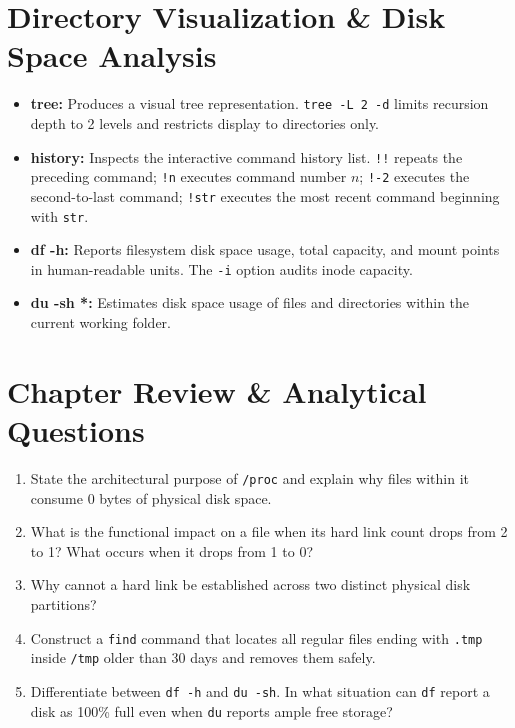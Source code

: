 \section{Directory Visualization \& Disk Space Analysis}
\begin{itemize}[leftmargin=1.5em]
    \item \textbf{tree:} Produces a visual tree representation. \texttt{tree -L 2 -d} limits recursion depth to 2 levels and restricts display to directories only.
    \item \textbf{history:} Inspects the interactive command history list. \texttt{!!} repeats the preceding command; \texttt{!n} executes command number $n$; \texttt{!-2} executes the second-to-last command; \texttt{!str} executes the most recent command beginning with \texttt{str}.
    \item \textbf{df -h:} Reports filesystem disk space usage, total capacity, and mount points in human-readable units. The \texttt{-i} option audits inode capacity.
    \item \textbf{du -sh *:} Estimates disk space usage of files and directories within the current working folder.
\end{itemize}

\section{Chapter Review \& Analytical Questions}
\begin{enumerate}[leftmargin=1.5em]
    \item State the architectural purpose of \texttt{/proc} and explain why files within it consume 0 bytes of physical disk space.
    \item What is the functional impact on a file when its hard link count drops from 2 to 1? What occurs when it drops from 1 to 0?
    \item Why cannot a hard link be established across two distinct physical disk partitions?
    \item Construct a \texttt{find} command that locates all regular files ending with \texttt{.tmp} inside \texttt{/tmp} older than 30 days and removes them safely.
    \item Differentiate between \texttt{df -h} and \texttt{du -sh}. In what situation can \texttt{df} report a disk as 100\% full even when \texttt{du} reports ample free storage?
\end{enumerate}
